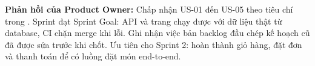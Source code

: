 \textbf{Phản hồi của Product Owner:} Chấp nhận US-01 đến US-05 theo tiêu chí trong . Sprint đạt Sprint Goal: API và trang  chạy được với dữ liệu thật từ database, CI chặn merge khi lỗi. Ghi nhận việc bản backlog đầu chép kế hoạch cũ đã được sửa trước khi chốt. Ưu tiên cho Sprint 2: hoàn thành giỏ hàng, đặt đơn và thanh toán để có luồng đặt món end-to-end.